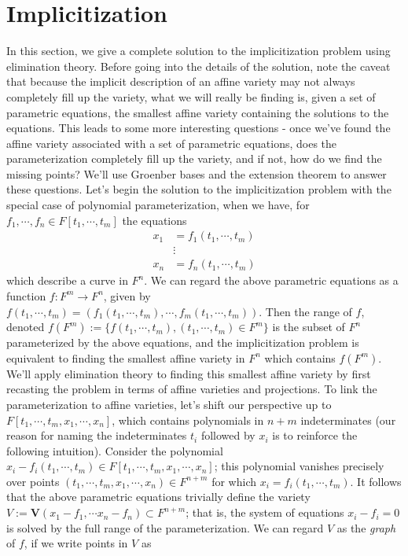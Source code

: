\documentclass{article}
\begin{document}
\section{Implicitization}
In this section, we give a complete solution to the implicitization problem using elimination theory. Before going into the details of the solution, note the caveat that because the implicit description of an affine variety may not always completely fill up the variety, what we will really be finding is, given a set of parametric equations, the smallest affine variety containing the solutions to the equations. This leads to some more interesting questions - once we've found the affine variety associated with a set of parametric equations, does the parameterization completely fill up the variety, and if not, how do we find the missing points? We'll use Groenber bases and the extension theorem to answer these questions.
\newline
Let's begin the solution to the implicitization problem with the special case of polynomial parameterization, when we have, for $ f_1, \cdots, f_n \in F[t_1, \cdots, t_m] $ the equations
$$ \begin{aligned}
	x_1 &= f_1(t_1, \cdots, t_m) \\
	& \vdots \\
	x_n &= f_n(t_1, \cdots, t_m)
\end{aligned} $$
which describe a curve in $ F^n $.
We can regard the above parametric equations as a function $ f: F^m \rightarrow F^n $, given by $ f(t_1, \cdots, t_m) = (f_1(t_1, \cdots, t_m), \cdots, f_m(t_1, \cdots, t_m)) $. Then the range of $ f $, denoted $ f(F^m) := \{ f(t_1, \cdots, t_m), (t_1, \cdots, t_m) \in F^m \} $ is the subset of $ F^n $ parameterized by the above equations, and the implicitization problem is equivalent to finding the smallest affine variety in $ F^n $ which contains $ f(F^m) $.
\newline
We'll apply elimination theory to finding this smallest affine variety by first recasting the problem in terms of affine varieties and projections. To link the parameterization to affine varieties, let's shift our perspective up to $ F[t_1, \cdots, t_m, x_1, \cdots, x_n] $, which contains polynomials in $ n + m $ indeterminates (our reason for naming the indeterminates $ t_i $ followed by $ x_i $ is to reinforce the following intuition). Consider the polynomial $ x_i - f_i(t_1, \cdots, t_m) \in F[t_1, \cdots, t_m, x_1, \cdots, x_n] $; this polynomial vanishes precisely over points $ (t_1, \cdots, t_m, x_1, \cdots, x_n) \in F^{n + m} $ for which $ x_i = f_i(t_1, \cdots, t_m) $. It follows that the above parametric equations trivially define the variety $ V := \mathbf{V}(x_1 - f_1, \cdots x_n - f_n) \subset F^{n + m} $; that is, the system of equations $ x_i - f_i = 0 $ is solved by the full range of the parameterization. We can regard $ V $ as the \textit{graph} of $ f $, if we write points in $ V $ as
\end{document}
